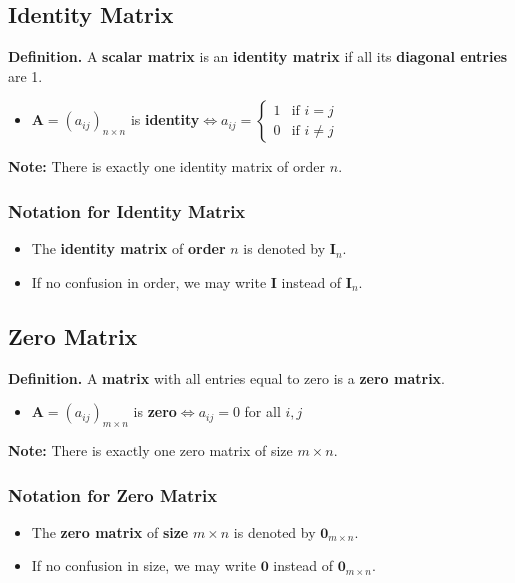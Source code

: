 \documentclass[../ma2001_notes.tex]{subfiles}
\begin{document}
\subsection{Identity Matrix}
\textbf{Definition.} A \textbf{scalar matrix} is an \textbf{identity matrix} if all its \textbf{diagonal entries} are 1.
\begin{itemize}
	\item\(\bm{A}=(a_{ij})_{n\times n}\) is \textbf{identity}\(\iff a_{ij}=\begin{cases}
		1 & \text{if }i=j \\
		0 & \text{if }i\ne j
	\end{cases}\)
\end{itemize}
\textbf{Note:} There is exactly one identity matrix of order \(n\).

\subsubsection{Notation for Identity Matrix}
\begin{itemize}
	\item The \textbf{identity matrix} of \textbf{order} \(n\) is denoted by \(\bm{I}_n\).
	\item If no confusion in order, we may write \(\bm{I}\) instead of \(\bm{I}_n\).
\end{itemize}

\subsection{Zero Matrix}
\textbf{Definition.} A \textbf{matrix} with all entries equal to zero is a \textbf{zero matrix}.
\begin{itemize}
	\item\(\bm{A}=(a_{ij})_{m\times n}\) is \textbf{zero}\(\iff a_{ij}=0\) for all \(i, j\)
\end{itemize}
\textbf{Note:} There is exactly one zero matrix of size \(m\times n\).

\subsubsection{Notation for Zero Matrix}
\begin{itemize}
	\item The \textbf{zero matrix} of \textbf{size} \(m\times n\) is denoted by \(\bm{0}_{m\times n}\).
	\item If no confusion in size, we may write \(\bm{0}\) instead of \(\bm{0}_{m\times n}\).
\end{itemize}
\end{document}
